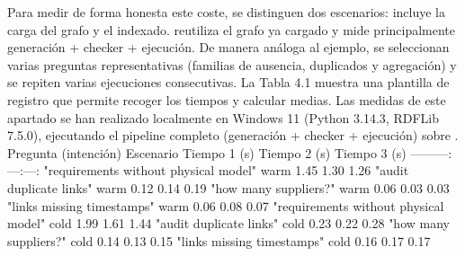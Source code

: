 {}Para medir de forma honesta este coste, se distinguen dos escenarios:\markdownRendererInterblockSeparator
{}\markdownRendererUlBeginTight
\markdownRendererUlItem {} incluye la carga del grafo y el indexado.\markdownRendererUlItemEnd 
\markdownRendererUlItem {} reutiliza el grafo ya cargado y mide principalmente generación + checker + ejecución.\markdownRendererUlItemEnd 
\markdownRendererUlEndTight \markdownRendererInterblockSeparator
{}De manera análoga al ejemplo, se seleccionan varias preguntas representativas (familias de ausencia, duplicados y agregación) y se repiten varias ejecuciones consecutivas. La Tabla 4.1 muestra una plantilla de registro que permite recoger los tiempos y calcular medias.\markdownRendererInterblockSeparator
{}Las medidas de este apartado se han realizado localmente en Windows 11 (Python 3.14.3, RDFLib 7.5.0), ejecutando el pipeline completo (generación + checker + ejecución) sobre .\markdownRendererInterblockSeparator
{}\markdownRendererInterblockSeparator
{}\markdownRendererPipe{} Pregunta (intención) \markdownRendererPipe{} Escenario \markdownRendererPipe{} Tiempo 1 (s) \markdownRendererPipe{} Tiempo 2 (s) \markdownRendererPipe{} Tiempo 3 (s) \markdownRendererPipe{} \markdownRendererPipe{}---\markdownRendererPipe{}---\markdownRendererPipe{}---:\markdownRendererPipe{}---:\markdownRendererPipe{}---:\markdownRendererPipe{} \markdownRendererPipe{} "requirements without physical model" \markdownRendererPipe{} warm \markdownRendererPipe{} 1.45 \markdownRendererPipe{} 1.30 \markdownRendererPipe{} 1.26 \markdownRendererPipe{} \markdownRendererPipe{} "audit duplicate links" \markdownRendererPipe{} warm \markdownRendererPipe{} 0.12 \markdownRendererPipe{} 0.14 \markdownRendererPipe{} 0.19 \markdownRendererPipe{} \markdownRendererPipe{} "how many suppliers?" \markdownRendererPipe{} warm \markdownRendererPipe{} 0.06 \markdownRendererPipe{} 0.03 \markdownRendererPipe{} 0.03 \markdownRendererPipe{} \markdownRendererPipe{} "links missing timestamps" \markdownRendererPipe{} warm \markdownRendererPipe{} 0.06 \markdownRendererPipe{} 0.08 \markdownRendererPipe{} 0.07 \markdownRendererPipe{} \markdownRendererPipe{} "requirements without physical model" \markdownRendererPipe{} cold \markdownRendererPipe{} 1.99 \markdownRendererPipe{} 1.61 \markdownRendererPipe{} 1.44 \markdownRendererPipe{} \markdownRendererPipe{} "audit duplicate links" \markdownRendererPipe{} cold \markdownRendererPipe{} 0.23 \markdownRendererPipe{} 0.22 \markdownRendererPipe{} 0.28 \markdownRendererPipe{} \markdownRendererPipe{} "how many suppliers?" \markdownRendererPipe{} cold \markdownRendererPipe{} 0.14 \markdownRendererPipe{} 0.13 \markdownRendererPipe{} 0.15 \markdownRendererPipe{} \markdownRendererPipe{} "links missing timestamps" \markdownRendererPipe{} cold \markdownRendererPipe{} 0.16 \markdownRendererPipe{} 0.17 \markdownRendererPipe{} 0.17 \markdownRendererPipe{}\markdownRendererInterblockSeparator
